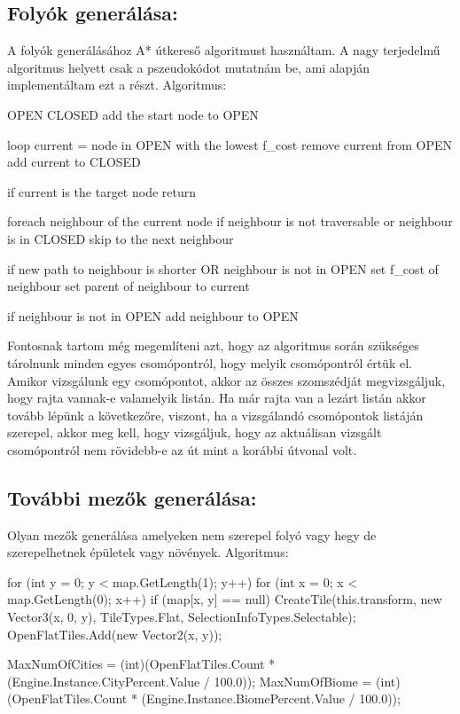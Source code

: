\subsection{Folyók generálása:}

A folyók generálásához A* útkereső algoritmust használtam. A nagy terjedelmű algoritmus helyett csak a pszeudokódot mutatnám be, ami alapján implementáltam ezt a részt.
\newline
\newline Algoritmus:

\begin{cpp}
OPEN 
CLOSED 
add the start node to OPEN

loop
   current = node in OPEN  with the lowest f_cost
   remove current from OPEN
   add current to CLOSED

   if current is the target node
      return

   foreach neighbour of the current node
      if neighbour is not traversable or neighbour is in CLOSED
         skip to the next neighbour

      if new path to neighbour is shorter OR neighbour is not in OPEN
         set f_cost of neighbour
         set parent of neighbour to current
         
         if neighbour is not in OPEN
            add neighbour to OPEN
\end{cpp}

\noindent Fontosnak tartom még megemlíteni azt, hogy az algoritmus során szükséges tárolnunk minden egyes csomópontról, hogy melyik csomópontról értük el. Amikor vizsgálunk egy csomópontot, akkor az összes szomszédját megvizsgáljuk, hogy rajta vannak-e valamelyik listán. Ha már rajta van a lezárt listán akkor tovább lépünk a következőre, viszont, ha a vizsgálandó csomópontok listáján szerepel, akkor meg kell, hogy vizsgáljuk, hogy az aktuálisan vizsgált csomópontról nem rövidebb-e az út mint a korábbi útvonal volt.

\subsection{További mezők generálása:}

Olyan mezők generálása amelyeken nem szerepel folyó vagy hegy de szerepelhetnek épületek vagy növények.
\newline
\newline Algoritmus:   

\begin{cpp}
for (int y = 0; y < map.GetLength(1); y++)
{
   for (int x = 0; x < map.GetLength(0); x++)
   {
      if (map[x, y] == null)
      {
         CreateTile(this.transform, new Vector3(x, 0, y),
         TileTypes.Flat, SelectionInfoTypes.Selectable);
         OpenFlatTiles.Add(new Vector2(x, y));
      }
   }
}

MaxNumOfCities = (int)(OpenFlatTiles.Count * 
(Engine.Instance.CityPercent.Value / 100.0));
MaxNumOfBiome = (int)(OpenFlatTiles.Count * 
(Engine.Instance.BiomePercent.Value / 100.0));
\end{cpp}

